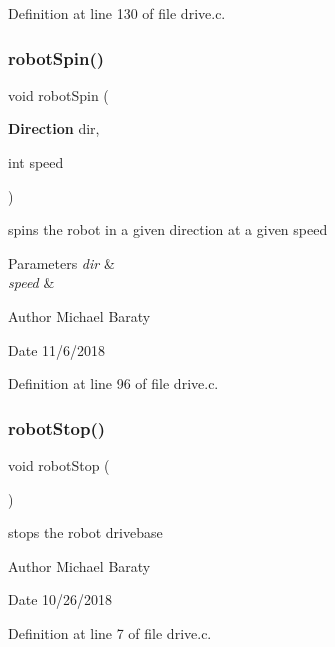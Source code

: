 Definition at line 130 of file drive.\+c.

\mbox{\label{drive_8h_ab8d8bae0e22ee3c8d2f3150295e5faba}} 
\subsubsection{robot\+Spin()}
{\footnotesize\ttfamily void robot\+Spin (\begin{DoxyParamCaption}\item[{\textbf{ Direction}}]{dir,  }\item[{int}]{speed }\end{DoxyParamCaption})}



spins the robot in a given direction at a given speed 


\begin{DoxyParams}{Parameters}
{\em dir} & \\
\hline
{\em speed} & \\
\hline
\end{DoxyParams}
\begin{DoxyAuthor}{Author}
Michael Baraty 
\end{DoxyAuthor}
\begin{DoxyDate}{Date}
11/6/2018 
\end{DoxyDate}


Definition at line 96 of file drive.\+c.

\mbox{\label{drive_8h_a69f6d219d1eedd14cd191b0b201796df}} 
\subsubsection{robot\+Stop()}
{\footnotesize\ttfamily void robot\+Stop (\begin{DoxyParamCaption}{ }\end{DoxyParamCaption})}



stops the robot drivebase 

\begin{DoxyAuthor}{Author}
Michael Baraty 
\end{DoxyAuthor}
\begin{DoxyDate}{Date}
10/26/2018 
\end{DoxyDate}


Definition at line 7 of file drive.\+c.

